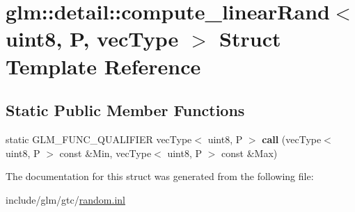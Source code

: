 \hypertarget{structglm_1_1detail_1_1compute__linearRand_3_01uint8_00_01P_00_01vecType_01_4}{}\section{glm\+:\+:detail\+:\+:compute\+\_\+linear\+Rand$<$ uint8, P, vec\+Type $>$ Struct Template Reference}
\label{structglm_1_1detail_1_1compute__linearRand_3_01uint8_00_01P_00_01vecType_01_4}
\subsection*{Static Public Member Functions}
\begin{DoxyCompactItemize}
\item 
\mbox{\label{structglm_1_1detail_1_1compute__linearRand_3_01uint8_00_01P_00_01vecType_01_4_aee2b1e5fe6b54c1765ba8051bcd37cfe}} 
static G\+L\+M\+\_\+\+F\+U\+N\+C\+\_\+\+Q\+U\+A\+L\+I\+F\+I\+ER vec\+Type$<$ uint8, P $>$ {\bfseries call} (vec\+Type$<$ uint8, P $>$ const \&Min, vec\+Type$<$ uint8, P $>$ const \&Max)
\end{DoxyCompactItemize}


The documentation for this struct was generated from the following file\+:\begin{DoxyCompactItemize}
\item 
include/glm/gtc/\hyperlink{random_8inl}{random.\+inl}\end{DoxyCompactItemize}
